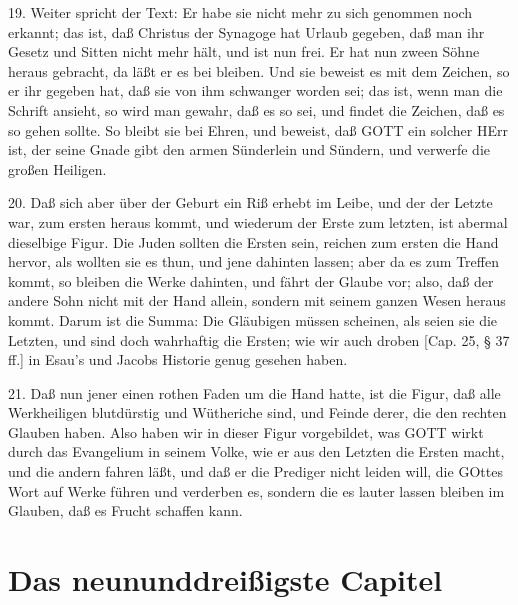 19. Weiter spricht der Text: Er habe sie nicht mehr zu sich genommen noch erkannt; das ist, daß Christus der Synagoge hat Urlaub gegeben, daß man ihr Gesetz und Sitten nicht mehr hält, und ist nun frei. Er hat nun zween Söhne heraus gebracht, da läßt er es bei bleiben. Und sie beweist es mit dem Zeichen, so er ihr gegeben hat, daß sie von ihm schwanger worden sei; das ist, wenn man die Schrift ansieht, so wird man gewahr, daß es so sei, und findet die Zeichen, daß es so gehen sollte. So bleibt sie bei Ehren, und beweist, daß GOTT ein solcher HErr ist, der seine Gnade gibt den armen Sünderlein und Sündern, und verwerfe die großen Heiligen.

20. Daß sich aber über der Geburt ein Riß erhebt im Leibe, und der der Letzte war, zum ersten heraus kommt, und wiederum der Erste zum letzten, ist abermal dieselbige Figur. Die Juden sollten die Ersten sein, reichen zum ersten die Hand hervor, als wollten sie es thun, und jene dahinten lassen; aber da es zum Treffen kommt, so bleiben die Werke dahinten, und fährt der Glaube vor; also, daß der andere Sohn nicht mit der Hand allein, sondern mit seinem ganzen Wesen heraus kommt. Darum ist die Summa: Die Gläubigen müssen scheinen, als seien sie die Letzten, und sind doch wahrhaftig die Ersten; wie wir auch droben [Cap. 25, § 37 ff.] in Esau’s und Jacobs Historie genug gesehen haben.

21. Daß nun jener einen rothen Faden um die Hand hatte, ist die Figur, daß alle Werkheiligen blutdürstig und Wütheriche sind, und Feinde derer, die den rechten Glauben haben. Also haben wir in dieser Figur vorgebildet, was GOTT wirkt durch das Evangelium in seinem Volke, wie er aus den Letzten die Ersten macht, und die andern fahren läßt, und daß er die Prediger nicht leiden will, die GOttes Wort auf Werke führen und verderben es, sondern die es lauter lassen bleiben im Glauben, daß es Frucht schaffen kann.

\section{Das neununddreißigste Capitel}

